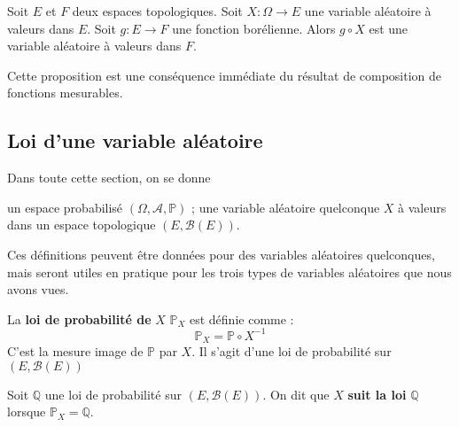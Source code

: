 \documentclass[../integ-proba.tex]{subfiles}
\begin{document}
\begin{prop}
    \label{prop:composition_var_bor}
    Soit $E$ et $F$ deux espaces topologiques.
    Soit $X:\Omega \longrightarrow E$ une variable aléatoire à valeurs dans $E$.
    Soit $g:E \longrightarrow F$ une fonction borélienne.
    Alors $g \circ X$ est une variable aléatoire à valeurs dans $F$.
\end{prop}

\begin{rem}
    Cette proposition est une conséquence immédiate du résultat de composition de fonctions mesurables.
\end{rem}

\subsection{Loi d'une variable aléatoire}

Dans toute cette section, on se donne
\begin{itemize}
    \itemb un espace probabilisé $\left(\Omega, \mathcal{A}, \mathbb{P}\right)$ ;
    \itemb une variable aléatoire quelconque $X$ à valeurs dans un espace topologique $\left(E, \mathcal{B}(E)\right)$.
\end{itemize}

Ces définitions peuvent être données pour des variables aléatoires quelconques, mais seront utiles en pratique pour les trois types de variables aléatoires que nous avons vues.

\begin{defi}
    La \textbf{loi de probabilité de} $X$ $\mathbb{P}_X$ est définie comme :
    $$
    \mathbb{P}_X=\mathbb{P} \circ X^{-1}
    $$
    C'est la mesure image de $\mathbb{P}$ par $X$.
    Il s'agit d'une loi de probabilité sur $\left(E, \mathcal{B}(E) \right)$
\end{defi}

\begin{defi}
    Soit $\mathbb{Q}$ une loi de probabilité sur $\left(E, \mathcal{B}(E) \right)$.
    On dit que $X$ \textbf{suit la loi} $\mathbb{Q}$ lorsque $\mathbb{P}_X = \mathbb{Q}$.
\end{defi}
\end{document}
